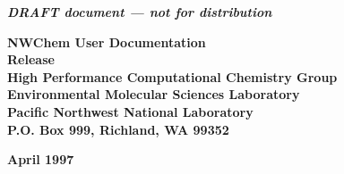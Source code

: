 
\begin{titlepage}

\begin{centering}

{\em\bf DRAFT document --- not for distribution\\[0.5in]}

{\bf\Huge NWChem User Documentation}\\[0.5in] 
{\bf\Huge Release \nwchemversion}\\[1.0in]

{\bf\Large High Performance Computational Chemistry Group\\
    Environmental Molecular Sciences Laboratory\\
    Pacific Northwest National Laboratory\\
    P.O. Box 999, Richland, WA 99352\\[0.5in]}

{\bf\Large April 1997}\\[1.0in]




\end{centering}

\end{titlepage}
